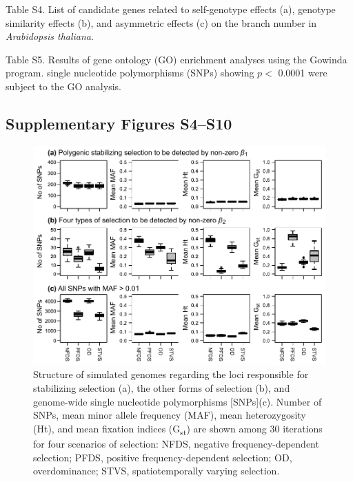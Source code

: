 \documentclass[12pt,]{article}
\begin{document}
\medskip
\noindent
Table S4. List of candidate genes related to self-genotype effects (a), genotype similarity effects (b), and asymmetric effects (c) on the branch number in \textit{Arabidopsis thaliana}.

\medskip
\noindent
Table S5. Results of gene ontology (GO) enrichment analyses using the Gowinda program. single nucleotide polymorphisms (SNPs) showing $p<$ 0.0001 were subject to the GO analysis. 


\newpage
\subsection*{Supplementary Figures S4--S10}

\begin{figure}[ht]
  \includegraphics[width=\linewidth]{FigS4_GenomeSummary.pdf}
  \caption{Structure of simulated genomes regarding the loci responsible for stabilizing selection (a), the other forms of selection (b), and genome-wide single nucleotide polymorphisms [SNPs](c). Number of SNPs, mean minor allele frequency (MAF), mean heterozygosity (Ht), and mean fixation indices (G\textsubscript{st}) are shown among 30 iterations for four scenarios of selection: NFDS, negative frequency-dependent selection; PFDS, positive frequency-dependent selection; OD, overdominance; STVS, spatiotemporally varying selection.}
  \label{figS4:GenStr}
\end{figure}
\end{document}
